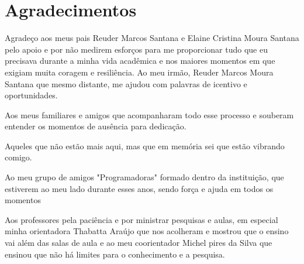 \chapter*{Agradecimentos}


Agradeço aos meus pais Reuder Marcos Santana e Elaine Cristina Moura Santana pelo apoio e por não medirem esforços para me proporcionar tudo que eu precisava durante a minha vida acadêmica e nos maiores momentos em que exigiam muita coragem e resiliência. Ao meu irmão, Reuder Marcos Moura Santana que mesmo distante, me ajudou com palavras de icentivo e oportunidades.

Aos meus familiares e amigos que acompanharam todo esse processo e souberam entender os momentos de ausência para dedicação.

Aqueles que não estão mais aqui, mas que em memória sei que estão vibrando comigo. 

Ao meu grupo de amigos "Programadoras" formado dentro da instituição, que estiverem ao meu lado durante esses anos, sendo força e ajuda em todos os momentos

Aos professores pela paciência e por ministrar pesquisas e aulas, em especial minha orientadora Thabatta Araújo que nos acolheram e mostrou que o ensino vai além das salas de aula e ao meu coorientador Michel pires da Silva que ensinou que não há limites para o conhecimento e a pesquisa.



